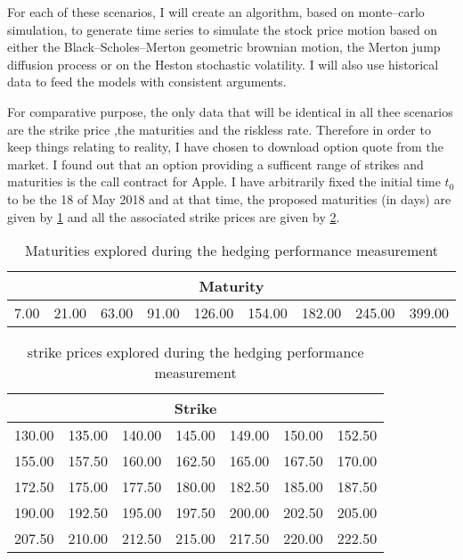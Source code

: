 \documentclass[12pt]{report}
\newcommand{\BSM}{Black--Scholes--Merton }
\begin{document}
For each of these scenarios, I will create an algorithm, based on monte--carlo simulation, to generate time series to simulate the stock price motion based on either the \BSM geometric brownian motion, the Merton jump diffusion process or on the Heston stochastic volatility.
I will also use historical data to feed the models with consistent arguments.

For comparative purpose, the only data that will be identical in all thee scenarios are the strike price ,the maturities and the riskless rate. Therefore in order to keep things relating to reality, I have chosen to download option quote from the market. I found out that an option providing a sufficent range of strikes and maturities is the call contract for Apple.
I have arbitrarily fixed the initial time $t_0$ to be the 18 of May 2018 and at that time, the proposed maturities (in days) are given by \cref{tab:methodology:maturity} and all the associated strike prices are given by \cref{tab:methodology:strike}.

\begin{table}[ht]
\centering
\begin{tabular}{rrrrrrrrr}
  \hline
  \multicolumn{9}{c}{Maturity} \\
  \hline
7.00 & 21.00 & 63.00 & 91.00 & 126.00 & 154.00 & 182.00 & 245.00 & 399.00 \\ 
   \hline
\end{tabular}
\caption{Maturities explored during the hedging performance measurement} 
\label{tab:methodology:maturity}
\end{table}
 
\begin{table}[ht]
\centering
\begin{tabular}{rrrrrrr}
  \hline
  \multicolumn{7}{c}{Strike} \\
  \hline
130.00 & 135.00 & 140.00 & 145.00 & 149.00 & 150.00 & 152.50 \\ 
  155.00 & 157.50 & 160.00 & 162.50 & 165.00 & 167.50 & 170.00 \\ 
  172.50 & 175.00 & 177.50 & 180.00 & 182.50 & 185.00 & 187.50 \\ 
  190.00 & 192.50 & 195.00 & 197.50 & 200.00 & 202.50 & 205.00 \\ 
  207.50 & 210.00 & 212.50 & 215.00 & 217.50 & 220.00 & 222.50 \\ 
   \hline
\end{tabular}
\caption{strike prices explored during the hedging performance measurement} 
\label{tab:methodology:strike}
\end{table}
\end{document}
